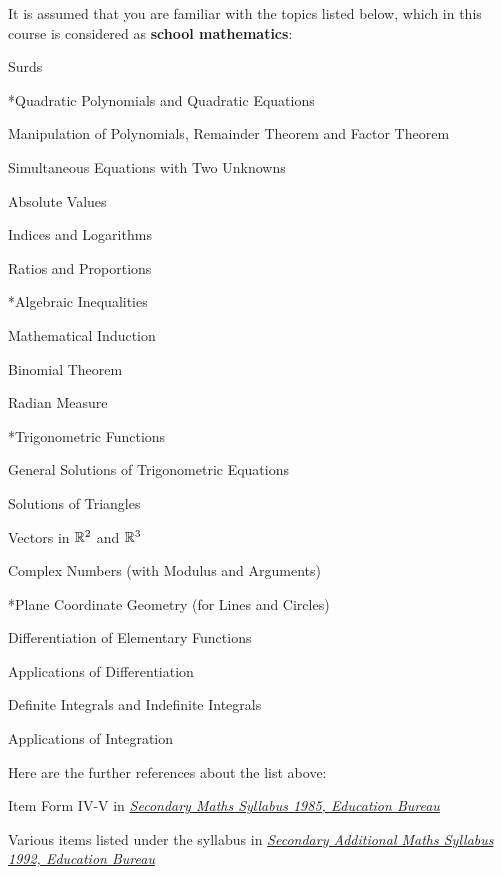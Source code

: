 \documentclass[a4paper,12pt]{article}
\begin{document}
It is assumed that you are familiar with the topics listed below, which in this course is considered as \textbf{school mathematics}:
\begin{alist}
  \item Surds
  \item **Quadratic Polynomials and Quadratic Equations
  \item Manipulation of Polynomials, Remainder Theorem and Factor Theorem
  \item Simultaneous Equations with Two Unknowns
  \item *Absolute Values
  \item Indices and Logarithms
  \item Ratios and Proportions
  \item **Algebraic Inequalities
  \item *Mathematical Induction
  \item *Binomial Theorem
  \item *Radian Measure
  \item **Trigonometric Functions
  \item *General Solutions of Trigonometric Equations
  \item *Solutions of Triangles
  \item *Vectors in $\mathbb{R}^{2}$ and $\mathbb{R}^{3}$
  \item *Complex Numbers (with Modulus and Arguments)
  \item **Plane Coordinate Geometry (for Lines and Circles)
  \item *Differentiation of Elementary Functions
  \item *Applications of Differentiation
  \item *Definite Integrals and Indefinite Integrals
  \item *Applications of Integration
\end{alist}
\pagebreak

Here are the further references about the list above:
\begin{Alist}
  \item Item Form IV-V in \href{https://www.edb.gov.hk/en/curriculum-development/kla/ma/curr/sec-math-1985.html}{\textit{Secondary Maths Syllabus 1985, Education Bureau}}
  \item Various items listed under the syllabus in \href{http://www.edb.gov.hk/en/curriculum-development/kla/ma/curr/add-math-1992.html}{\textit{Secondary Additional Maths Syllabus 1992, Education Bureau}}
\end{Alist}
\end{document}
